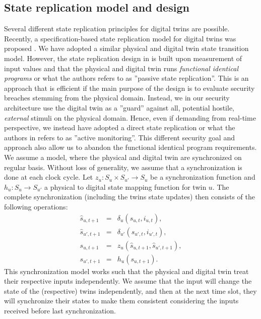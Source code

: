 \subsection{State replication model and design}
\label{Dtwinconcept:replication}

Several different state replication principles for digital twins are possible. Recently, a specification-based state replication model for digital twins was proposed \cite{Eckhart2018}. We have adopted a similar physical and digital twin state transition model. However, the state replication design in \cite{Eckhart2018} is built upon measurement of input values and that the physical and digital twin runs {\it functional identical programs} or what the authors refers to as ''passive state replication''. This is an approach that is efficient if the main purpose of the design is to evaluate security breaches stemming from the physical domain. Instead, we in our security architecture use the digital twin as a ''guard'' against all, potential hostile, {\it external} stimuli on the physical domain. Hence, even if demanding from real-time perspective, we instead have adopted a direct state replication or what the authors in \cite{Eckhart2018} refers to as ''active monitoring''. This different security goal and approach also allow us to abandon the functional identical program requirements. 
We assume a model, where the physical and digital twin are synchronized on regular basis. Without loss of generality, we assume that a synchronization is done at each clock cycle. Let $z_u:S_u \times S_{u'}\rightarrow S_u$ be a synchronization function and $h_u: S_u \rightarrow S_{u'}$ a physical to digital state mapping function for twin $u$. The complete synchronization (including the twins state updates) then consists of the following operations:
\vspace*{-0.08in}
\begin{eqnarray}
\hat{s}_{u,t+1} & = & \delta_u(s_{u,t},i_{u,t}) \label{physprelsynch}, \\
\hat{s}_{u',t+1} &=& \delta_{u'}(s_{u',t},i_{u',t}) \label{digprelsynch}, \\
	s_{u,t+1} & = & z_u(\hat{s}_{u,t+1},\hat{s}_{u',t+1}) \label{digtsynch}, \\ 
	s_{u',t+1} & = & h_u(s_{u,t+1}). \label{physdsynch}
\end{eqnarray}
This synchronization model works such that the physical and digital twin treat their respective inputs independently. We assume that the input will change the state of the (respective) twins independently, and then at the next time slot, they will synchronize their states to make them consistent considering the inputs received before last synchronization. 

